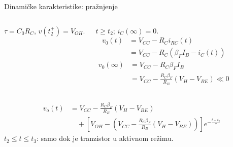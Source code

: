 \begin{frame}[label=10-s030]{Dinamičke karakteristike: pražnjenje}
\setlength{\abovedisplayskip}{4pt}\setlength{\belowdisplayskip}{4pt}\setlength{\abovedisplayshortskip}{3pt}\setlength{\belowdisplayshortskip}{3pt}
\begin{columns}[T,onlytextwidth]\centering\par
$\tau=C_0R_C$, $v(t_2^+)=V_{OH}$.\centering \raggedright
$t\geq t_2$; $i_C(\infty)=0$.
\[\begin{aligned}v_0(t)&=V_{CC}-R_Ci_{RC}(t)\\&=V_{CC}-R_C(\beta_FI_B-i_C(t))\end{aligned}\]
\[\begin{aligned}v_0(\infty)&=V_{CC}-R_C\beta_FI_B\\&=V_{CC}-\frac{R_C\beta_F}{R_B}(V_H-V_{BE})\ll0\end{aligned}\]
\end{columns}\smallskip
\[\begin{aligned}v_o(t)&=V_{CC}-\frac{R_C\beta_F}{R_B}(V_H-V_{BE})\\
&\quad+\left[V_{OH}-\left(V_{CC}-\frac{R_C\beta_F}{R_B}(V_H-V_{BE})\right)\right]e^{-\frac{t-t_2}{\tau}}
\end{aligned}\]
\centering\textcolor{DEcrvena}{$t_2\leq t\leq t_3$: samo dok je tranzistor u aktivnom režimu.}
\end{frame}
